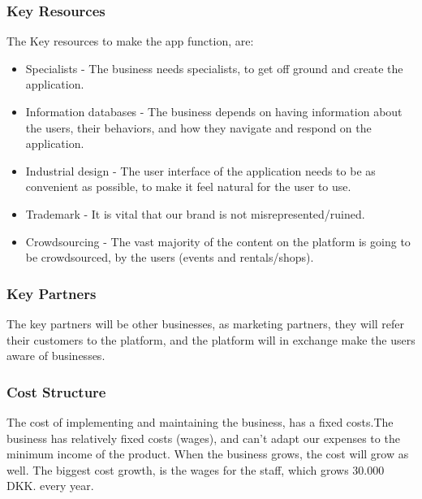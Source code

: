 \subsubsection{Key Resources}
The Key resources to make the app function, are:
\begin{itemize}
	\item Specialists - The business needs specialists, to get off ground and create the application.
	\item Information databases - The business depends on having information about the users, their behaviors, and how they navigate and respond on the application.
	\item Industrial design - The user interface of the application needs to be as convenient as possible, to make it feel natural for the user to use.
	\item Trademark - It is vital that our brand is not misrepresented/ruined.
	\item Crowdsourcing - The vast majority of the content on the platform is going to be crowdsourced, by the users (events and rentals/shops).
\end{itemize}

\subsubsection{Key Partners}
The key partners will be other businesses, as marketing partners, they will refer their customers to the platform, and the platform will in exchange make the users aware of businesses.

\subsubsection{Cost Structure}
The cost of implementing and maintaining the business, has a fixed costs.The business has relatively fixed costs (wages), and can't adapt our expenses to the minimum income of the product. When the business grows, the cost will grow as well. The biggest cost growth, is the wages for the staff, which grows 30.000 DKK. every year. 
